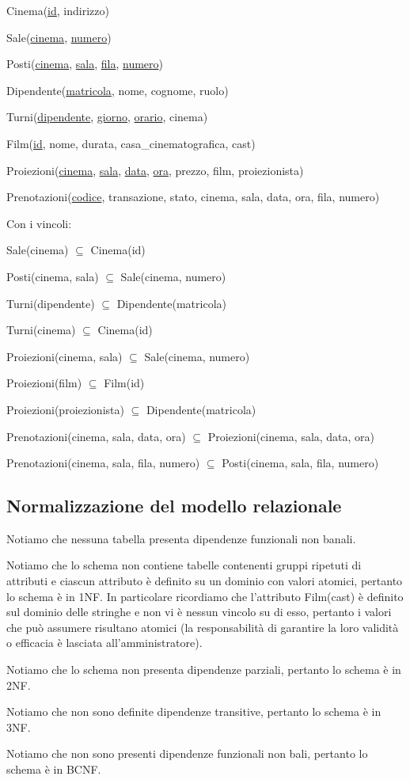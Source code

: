 Cinema(\underline{id}, indirizzo)

Sale(\underline{cinema}, \underline{numero})

Posti(\underline{cinema},
\underline{sala},
\underline{fila},
\underline{numero})

Dipendente(\underline{matricola}, nome, cognome, ruolo)

Turni(\underline{dipendente}, \underline{giorno}, \underline{orario}, cinema)

Film(\underline{id}, nome, durata, casa\_cinematografica, cast)

Proiezioni(\underline{cinema},
\underline{sala},
\underline{data},
\underline{ora},
prezzo,
film,
proiezionista)

Prenotazioni(\underline{codice},
transazione,
stato,
cinema,
sala,
data,
ora,
fila,
numero)

\quad Con i vincoli:

Sale(cinema) $\subseteq$ Cinema(id)

Posti(cinema, sala) $\subseteq$ Sale(cinema, numero)

Turni(dipendente) $\subseteq$ Dipendente(matricola)

Turni(cinema) $\subseteq$ Cinema(id)

Proiezioni(cinema, sala) $\subseteq$ Sale(cinema, numero)

Proiezioni(film) $\subseteq$ Film(id)

Proiezioni(proiezionista) $\subseteq$ Dipendente(matricola)

Prenotazioni(cinema, sala, data, ora)
$\subseteq$
Proiezioni(cinema, sala, data, ora)

Prenotazioni(cinema, sala, fila, numero)
$\subseteq$
Posti(cinema, sala, fila, numero)

\subsection*{Normalizzazione del modello relazionale}
%
%

Notiamo che nessuna tabella presenta dipendenze funzionali non banali. 

Notiamo che lo schema non contiene tabelle contenenti gruppi ripetuti di
attributi e ciascun attributo è definito su un dominio con valori atomici,
pertanto lo schema è in 1NF.
In particolare ricordiamo che l'attributo Film(cast) è definito
sul dominio delle stringhe e non vi è nessun vincolo su di esso, pertanto
i valori che può assumere risultano atomici (la responsabilità di garantire
la loro validità o efficacia è lasciata all'amministratore).

Notiamo che lo schema non presenta dipendenze parziali, pertanto lo schema è in
2NF.

Notiamo che non sono definite dipendenze transitive, pertanto lo schema è in
3NF.

Notiamo che non sono presenti dipendenze funzionali non bali, pertanto lo
schema è in BCNF.

